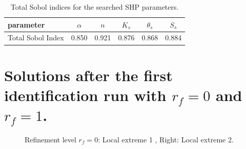 \documentclass[review,times,3p,10pt]{elsarticle}
\begin{document}
\begin{table}[ht]
\begin{center}
\caption{Total Sobol indices for the searched SHP parameters.}
\begin{small}
\doublespacing
\begin{tabular}{l||c c c c c}
\toprule
parameter & $\alpha$ & $n$ & $K_s$ & $\theta_s$ & $S_s$ \\ \hline
\toprule
Total Sobol Index & 0.850 & 0.921 & 0.876 & 0.868 & 0.884 \\
\toprule
\end{tabular}
\end{small}
\label{citlivost}
\end{center}
\end{table}

\section{Solutions after the first identification run with $r_f=0$ and $r_f=1$.}

\begin{figure}[htb!]
\label{rf0ex1}
\caption{Refinement level $r_f=0$: Local extreme 1 , Right: Local extreme 2.}
\end{figure}
\end{document}
